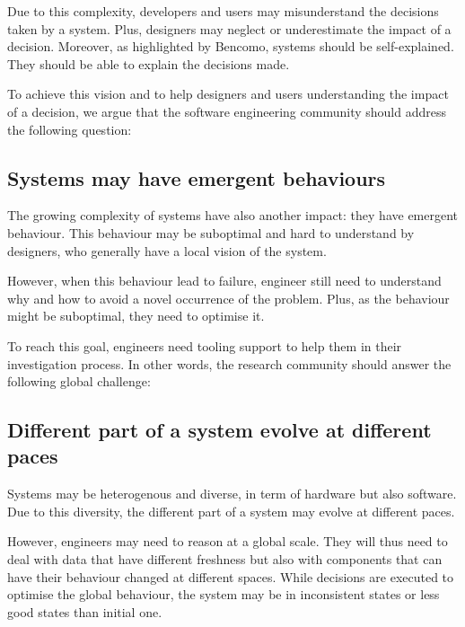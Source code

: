 Due to this complexity, developers and users may misunderstand the decisions taken by a system.
Plus, designers may neglect or underestimate the impact of a decision.
Moreover, as highlighted by Bencomo\etal, systems should be self-explained.
They should be able to explain the decisions made.

To achieve this vision and to help designers and users understanding the impact of a decision, we argue that the software engineering community should address the following question:
\vspace{-2em}

\subsection{Systems may have emergent behaviours}
\label{intro:challenges:ermger-bhv}
The growing complexity of systems have also another impact: they have emergent behaviour.
This behaviour may be suboptimal and hard to understand by designers, who generally have a local vision of the system.

However, when this behaviour lead to failure, engineer still need to understand why and how to avoid a novel occurrence of the problem.
Plus, as the behaviour might be suboptimal, they need to optimise it.

To reach this goal, engineers need tooling support to help them in their investigation process.
In other words, the research community should answer the following global challenge:
\vspace{-2em}

\subsection{Different part of a system evolve at different paces}
\label{intro:challenges:diff-paces}
Systems may be heterogenous and diverse, in term of hardware but also software.
Due to this diversity, the different part of a system may evolve at different paces.

However, engineers may need to reason at a global scale.
They will thus need to deal with data that have different freshness but also with components that can have their behaviour changed at different spaces.
While decisions are executed to optimise the global behaviour, the system may be in inconsistent states or less good states than initial one.

